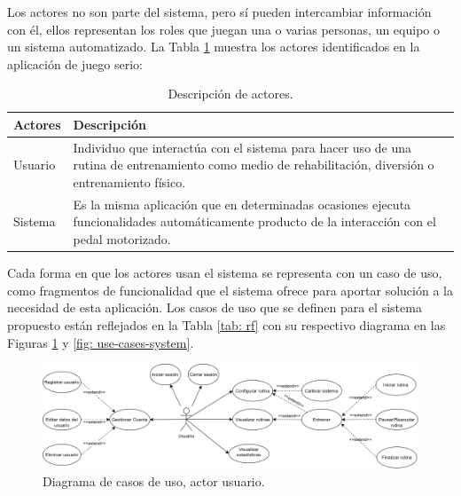 Los actores no son parte del sistema, pero sí pueden intercambiar información con él, ellos representan los roles que juegan una o varias personas, un equipo o un sistema automatizado. La Tabla \ref{tab: actores} muestra los actores identificados en la aplicación de juego serio:

\begin{table}[ht]
    \centering
    \begin{tabularx}{\textwidth}{|l|X|}
        \hline
        \textbf{Actores} & \textbf{Descripción} \\\hline
        Usuario & Individuo que interactúa con el sistema para hacer uso de una rutina de entrenamiento
        como medio de rehabilitación, diversión o entrenamiento físico. \\\hline
        Sistema & Es la misma aplicación que en determinadas ocasiones ejecuta funcionalidades automáticamente producto de la interacción con el pedal motorizado. \\\hline
    \end{tabularx}
    \caption{Descripción de actores.}
    \label{tab: actores}
\end{table}

Cada forma en que los actores usan el sistema se representa con un caso de uso, como fragmentos de funcionalidad que el sistema ofrece para aportar solución a la necesidad de esta aplicación. Los casos de uso que se definen para el sistema propuesto están reflejados en la Tabla \ref{tab: rf} con su respectivo diagrama en las Figuras \ref{fig: use-cases-user} y \ref{fig: use-cases-system}.

\begin{figure}[!ht]
    \centering
    \includegraphics[scale=0.46]{images/diagram-usecase-user.png}
    \caption{Diagrama de casos de uso, actor usuario.}
    \label{fig: use-cases-user}
\end{figure}

